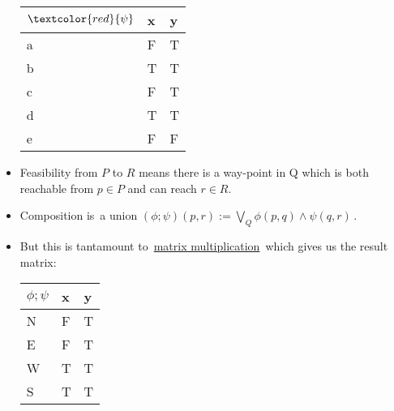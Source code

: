 \begin{itemize}
          \begin{minipage}{0.48\textwidth}

            \begin{tabular}{|l|l|l|}
              \hline
              $\textcolor{red}{\psi}$ & x & y \\ \hline
              a                       & F & T \\ \hline
              b                       & T & T \\ \hline
              c                       & F & T \\ \hline
              d                       & T & T \\ \hline
              e                       & F & F \\ \hline
            \end{tabular}
          \end{minipage}

    \item Feasibility from $P$ to $R$ means there is a way-point in Q which is both reachable from $p \in P$ and can reach $r \in R$.
    \item Composition is \,a union $(\phi;\psi)(p,r):= \bigvee_Q \phi(p,q)\land \psi(q,r)$\,.
    \item But this is tantamount to \,\href{doc/1 math/Seven Sketches in Compositionality/Chapter 2: Resource theories/5 Computing presented V-categories with matrix mult/3 Matrix multiplication in a quantale/1 Quantale matrix}{matrix multiplication}\, which gives us the result matrix:


          \begin{minipage}{0.48\textwidth}

            \begin{tabular}{|l|l|l|}
              \hline
              $\phi;\psi$ & x & y \\ \hline
              N           & F & T \\ \hline
              E           & F & T \\ \hline
              W           & T & T \\ \hline
              S           & T & T \\ \hline
            \end{tabular}
          \end{minipage}

  \end{itemize}
